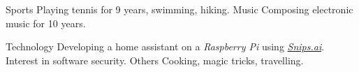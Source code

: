 
	\begin{cvskills}
		\cvskill
			{Sports}
			{Playing tennis for 9 years, swimming, hiking.}
		\cvskill
			{Music}
			{Composing electronic music for 10 years.}
	
		\cvskill
			{Technology}
			{Developing a home assistant on a \textit{Raspberry Pi} using \href{https://snips.ai/}{\textit{Snips.ai}}. Interest in software security.}
		\cvskill
			{Others}
			{Cooking, magic tricks, travelling.}
			
	\end{cvskills}
